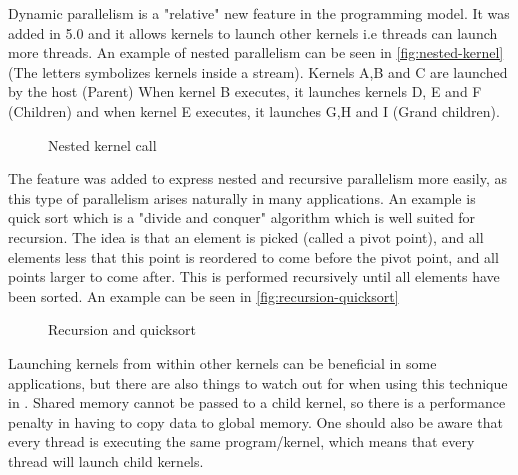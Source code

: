 Dynamic parallelism is a "relative" new feature in the \cuda{} programming model.
It was added in \cuda{} 5.0 and it allows kernels to launch other kernels i.e threads can launch more threads.
An example of nested parallelism can be seen in \autoref{fig:nested-kernel} (The letters symbolizes kernels inside a \cuda{} stream).
Kernels A,B and C are launched by the host (Parent)
When kernel B executes, it launches kernels D, E and F (Children) and when kernel E executes, it launches G,H and I (Grand children).
\begin{figure}[ht]
	\centering
	\caption{Nested kernel call}
	\label{fig:nested-kernel}
\end{figure}
The feature was added to express nested and recursive parallelism more easily, as this type of parallelism arises naturally in many applications.
An example is quick sort which is a "divide and conquer" algorithm which is well suited for recursion.
The idea is that an element is picked (called a pivot point), and all elements less that this point is reordered to come before the pivot point, and all points larger to come after.
This is performed recursively until all elements have been sorted.
An example can be seen in \autoref{fig:recursion-quicksort}
\begin{figure}[ht]
	\centering
	\caption{Recursion and quicksort}
	\label{fig:recursion-quicksort}
\end{figure}

\noindent Launching kernels from within other kernels can be beneficial in some applications, but there are also things to watch out for when using this technique in \cuda{}.
Shared memory cannot be passed to a child kernel, so there is a performance penalty in having to copy data to global memory.
One should also be aware that every thread is executing the same program/kernel, which means that every thread will launch child kernels.